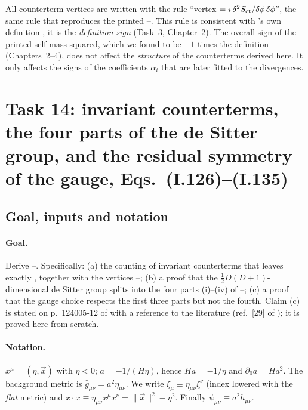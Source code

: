 \begin{notebox}
All counterterm vertices are written with the rule ``vertex $=i\,\delta^2S_{\rm ct}/\delta\phi\,\delta\phi$'', the same rule that reproduces the printed --.
This rule is consistent with \PI's own definition , \ie it is the \emph{definition sign} (Task~3, Chapter~2).
The overall sign of the printed self-mass-squared, which we found to be $-1$ times the definition (Chapters~2--4), does not affect the \emph{structure} of the counterterms derived here.
It only affects the signs of the coefficients $\alpha_i$ that are later fitted to the divergences.
\end{notebox}

\section{Task 14: invariant counterterms, the four parts of the de Sitter group, and the residual symmetry of the gauge, Eqs.\ (I.126)--(I.135)}
\label{sec:ch7-task14}

\subsection{Goal, inputs and notation}

\paragraph{Goal.}
Derive --.
Specifically:
(a) the counting of invariant counterterms that leaves exactly , together with the vertices --;
(b) a proof that the $\tfrac12D(D+1)$-dimensional de Sitter group splits into the four parts (i)--(iv) of --;
(c) a proof that the gauge choice  respects the first three parts but not the fourth.
Claim (c) is stated on p.~124005-12 of \PI{} with a reference to the literature (ref.~[29] of \PI); it is proved here from scratch.

\paragraph{Notation.}
$x^\mu=(\eta,\vec x)$ with $\eta<0$; $a=-1/(H\eta)$, hence $Ha=-1/\eta$ and $\partial_0a=Ha^2$.
The background metric is $\hat g_{\mu\nu}=a^2\eta_{\mu\nu}$.
We write $\xi_\mu\equiv\eta_{\mu\nu}\xi^\nu$ (index lowered with the \emph{flat} metric) and
$x\cdot x\equiv\eta_{\mu\nu}x^\mu x^\nu=\|\vec x\|^2-\eta^2$.
Finally $\psi_{\mu\nu}\equiv a^2h_{\mu\nu}$.

